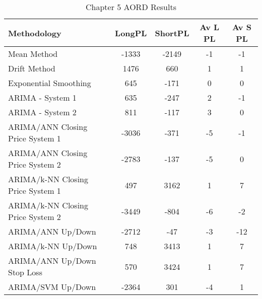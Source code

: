 \begin{table}[ht]
\centering
\caption[Chapter 5 AORD Results]{Chapter 5 AORD Results} 
\label{tab:chp6:aord2_summary}
\begin{tabular}{lcccc}
  \toprule Methodology & LongPL & ShortPL & Av L PL & Av S PL \\ 
  \midrule Mean Method & -1333 & -2149 & -1 & -1 \\ 
  Drift Method & 1476 & 660 & 1 & 1 \\ 
  Exponential Smoothing & 645 & -171 & 0 & 0 \\ 
  ARIMA - System 1 & 635 & -247 & 2 & -1 \\ 
  ARIMA - System 2 & 811 & -117 & 3 & 0 \\ 
  ARIMA/ANN Closing Price System 1 & -3036 & -371 & -5 & -1 \\ 
  ARIMA/ANN Closing Price System 2 & -2783 & -137 & -5 & 0 \\ 
  ARIMA/k-NN Closing Price System 1 & 497 & 3162 & 1 & 7 \\ 
  ARIMA/k-NN Closing Price System 2 & -3449 & -804 & -6 & -2 \\ 
  ARIMA/ANN Up/Down & -2712 & -47 & -3 & -12 \\ 
  ARIMA/k-NN Up/Down & 748 & 3413 & 1 & 7 \\ 
  ARIMA/ANN Up/Down Stop Loss & 570 & 3424 & 1 & 7 \\ 
  ARIMA/SVM Up/Down & -2364 & 301 & -4 & 1 \\ 
   \bottomrule \end{tabular}
\end{table}
